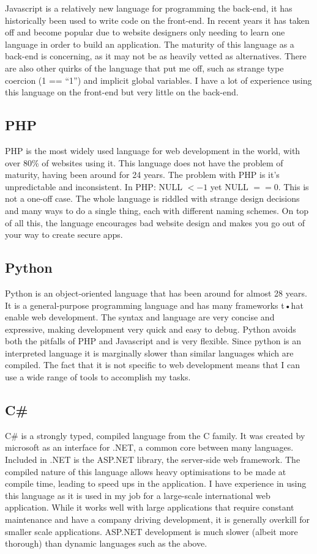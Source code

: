\documentclass[a4paper,oneside,12pt]{report}
\begin{document}
	Javascript is a relatively new language for programming the back-end, it has historically been used to write code on the front-end. In recent years it has taken off and become popular due to website designers only needing to learn one language in order to build an application. The maturity of this language as a back-end is concerning, as it may not be as heavily vetted as alternatives. There are also other quirks of the language that put me off, such as strange type coercion (1 == “1”) and implicit global variables. I have a lot of experience using this language on the front-end but very little on the back-end.

	\subsection{PHP}
	PHP is the most widely used language for web development in the world, with over 80\% of websites using it. This language does not have the problem of maturity, having been around for 24 years. The problem with PHP is it’s unpredictable and inconsistent. In PHP: NULL \(< -1\) yet NULL \(== 0\). This is not a one-off case. The whole language is riddled with strange design decisions and many ways to do a single thing, each with different naming schemes. On top of all this, the language encourages bad website design and makes you go out of your way to create secure apps.

	\subsection{Python}
	Python is an object-oriented language that has been around for almost 28 years. It is a general-purpose programming language and has many frameworks t•hat enable web development. The syntax and language are very concise and expressive, making development very quick and easy to debug. Python avoids both the pitfalls of PHP and Javascript and is very flexible. Since python is an interpreted language it is marginally slower than similar languages which are compiled. The fact that it is not specific to web development means that I can use a wide range of tools to accomplish my tasks.
	
	\subsection{C\#}
	C\# is a strongly typed, compiled language from the C family. It was created by microsoft as an interface for .NET, a common core between many languages. Included in .NET is the ASP.NET library, the server-side web framework. The compiled nature of this language allows heavy optimisations to be made at compile time, leading to speed ups in the application. I have experience in using this language as it is used in my job for a large-scale international web application. While it works well with large applications that require constant maintenance and have a company driving development, it is generally overkill for smaller scale applications. ASP.NET development is much slower (albeit more thorough) than dynamic languages such as the above.
	
\end{document}
